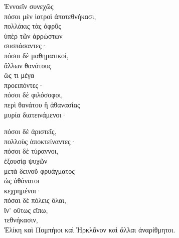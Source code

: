 {\large
\begin{greek}
\noindent Ἐννοεῖν συνεχῶς \\
\tabto{2em} πόσοι μὲν ἰατροὶ ἀποτεθνήκασι, \\

\tabto{4em} πολλάκις τὰς ὀφρῦς \\
\tabto{6em} ὑπὲρ τῶν ἀρρώστων \\
\tabto{4em} συσπάσαντες· \\
\tabto{2em} πόσοι δὲ μαθηματικοί, \\
\tabto{4em} ἄλλων θανάτους \\
\tabto{6em} ὥς τι μέγα \\
\tabto{4em} προειπόντες· \\
\tabto{2em} πόσοι δὲ φιλόσοφοι, \\
\tabto{6em} περὶ θανάτου ἢ ἀθανασίας \\
\tabto{4em} μυρία διατεινάμενοι·

\tabto{2em} πόσοι δὲ ἀριστεῖς, \\
\tabto{4em} πολλοὺς ἀποκτείναντες· \\
\tabto{2em} πόσοι δὲ τύραννοι, \\
\tabto{4em} ἐξουσίᾳ ψυχῶν \\
\tabto{6em} μετὰ δεινοῦ φρυάγματος \\
\tabto{6em} ὡς ἀθάνατοι \\
\tabto{4em} κεχρημένοι· \\
\tabto{2em} πόσαι δὲ πόλεις ὅλαι, \\
\tabto{4em} ἵν' οὕτως εἴπω, \\
\tabto{2em} τεθνήκασιν, \\
\tabto{4em} Ἑλίκη καὶ Πομπήιοι καὶ Ἡρκλᾶνον καὶ ἄλλαι ἀναρίθμητοι.\\

\end{greek}
}


